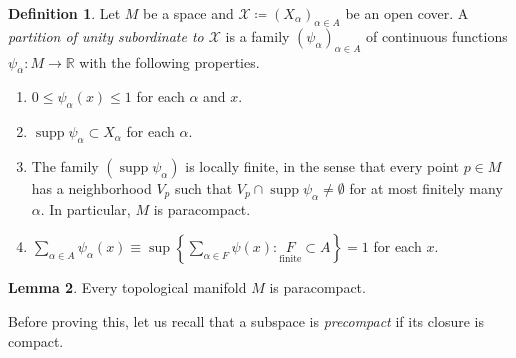 \documentclass[10pt,letterpaper,cm]{nupset}
\theoremstyle{definition}
\newtheorem{definition}{Definition}[subsection]
\theoremstyle{theorem}
\newtheorem{lemma}[definition]{Lemma}
\theoremstyle{remark}
\newcommand{\R}{\mathbb R}
\newcommand{\1}{\mathbf{1}}
\newcommand{\0}{\vec 0}
\DeclareMathOperator{\supp}{supp}
\begin{document}
\begin{definition} Let $M$ be a space and $\mathcal{X}\coloneqq \left(X_\alpha\right)_{\alpha \in A}$ be an open cover. A \textit{partition of unity subordinate to $\mathcal{X}$} is a family $\left(\psi_\alpha\right)_{\alpha \in A}$ of continuous functions $\psi_\alpha : M \to \R$ with the following properties.
\begin{enumerate}[label=(\alph*)]
\item $0\leq \psi_\alpha(x) \leq 1$ for each $\alpha$ and $x$.
\item $\supp \psi_\alpha \subset X_\alpha$ for each $\alpha$.
\item The family $\left(\supp \psi_\alpha\right)$ is locally finite, in the sense that every point $p\in M$ has a neighborhood $V_p$ such that $V_p \cap \supp \psi_\alpha \ne \emptyset$ for at most finitely many $\alpha$. In particular, $M$ is paracompact.
\item $\sum_{\alpha \in A} \psi_\alpha(x) \equiv \sup\left\{\sum_{\alpha \in F}\psi(x) : \underset{\text{finite}} F \subset A\right\} = 1$ for each $x$.
\end{enumerate}
\end{definition}  

\begin{lemma}
Every topological manifold $M$ is paracompact. 
\end{lemma}

Before proving this, let us recall that a subspace is \textit{precompact} if its closure is compact.
\end{document}
